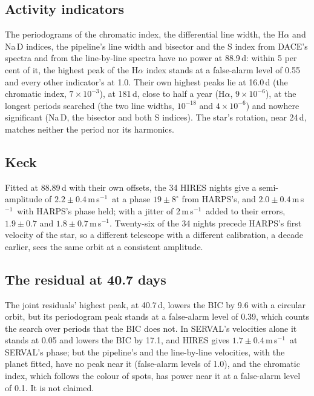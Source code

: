 \documentclass[3p,11pt]{elsarticle}
\newcommand{\ms}{m\,s$^{-1}$}
\begin{document}
\subsection{Activity indicators}

The periodograms of the chromatic index, the differential line width, the H$\alpha$ and Na\,D indices,
the pipeline's line width and bisector and the S index from DACE's spectra and from the line-by-line
spectra have no power at 88.9\,d: within 5 per cent of it, the highest peak of the H$\alpha$ index stands
at a false-alarm level of 0.55 and every other indicator's at 1.0. Their own highest peaks lie at
16.0\,d (the chromatic index, $7\times10^{-3}$), at 181\,d, close to half a year (H$\alpha$,
$9\times10^{-6}$), at the longest periods searched (the two line widths, $10^{-18}$ and
$4\times10^{-6}$) and nowhere significant (Na\,D, the bisector and both S indices). The star's rotation, near 24\,d, matches neither the period
nor its harmonics.

\subsection{Keck}

Fitted at 88.89\,d with their own offsets, the 34 HIRES nights give a semi-amplitude of
$2.2 \pm 0.4$\,\ms\ at a phase $19 \pm 8^\circ$ from HARPS's, and $2.0 \pm 0.4$\,\ms\ with HARPS's phase
held; with a jitter of 2\,\ms\ added to their errors, $1.9 \pm 0.7$ and $1.8 \pm 0.7$\,\ms. Twenty-six
of the 34 nights precede HARPS's first velocity of the star, so a different telescope with a different
calibration, a decade earlier, sees the same orbit at a consistent amplitude.

\subsection{The residual at 40.7 days}

The joint residuals' highest peak, at 40.7\,d, lowers the BIC by 9.6 with a circular orbit, but its
periodogram peak stands at a false-alarm level of 0.39, which counts the search over periods that the
BIC does not. In SERVAL's velocities alone it stands at 0.05 and lowers the BIC by 17.1, and HIRES
gives $1.7 \pm 0.4$\,\ms\ at SERVAL's phase; but the pipeline's and the line-by-line velocities, with
the planet fitted, have no peak near it (false-alarm levels of 1.0), and the chromatic index, which
follows the colour of spots, has power near it at a false-alarm level of 0.1. It is not claimed.
\end{document}
